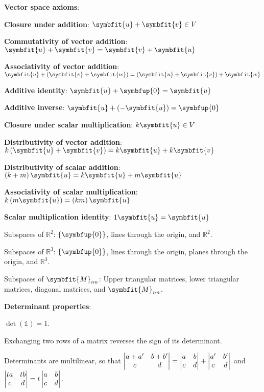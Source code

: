 \documentclass{article}
\begin{document}
\noindent\textbf{Vector space axioms}:

\noindent\textbf{Closure under addition}: $\symbfit{u}+\symbfit{v} \in V$ 

\noindent\textbf{Commutativity of vector addition}: $\symbfit{u} + \symbfit{v} = \symbfit{v} + \symbfit{u}$

\noindent\textbf{Associativity of vector addition}: $\symbfit{u} + \left(\symbfit{v} + \symbfit{w}\right) = \left(\symbfit{u} + \symbfit{v}\right) + \symbfit{w}$

\noindent\textbf{Additive identity}: $\symbfit{u} + \symbfup{0} = \symbfit{u}$

\noindent\textbf{Additive inverse}: $\symbfit{u} + \left(-\symbfit{u}\right) = \symbfup{0}$

\noindent\textbf{Closure under scalar multiplication}: $k\symbfit{u} \in V$

\noindent\textbf{Distributivity of vector addition}: $k \left(\symbfit{u} + \symbfit{v}\right) = k\symbfit{u} + k\symbfit{v}$

\noindent\textbf{Distributivity of scalar addition}: $\left(k+m\right)\symbfit{u} = k\symbfit{u} + m\symbfit{u}$

\noindent\textbf{Associativity of scalar multiplication}: $k\left(m\symbfit{u}\right)=\left(km\right)\symbfit{u}$

\noindent\textbf{Scalar multiplication identity}: $1 \symbfit{u}=\symbfit{u}$

\noindent Subspaces of $\mathbb{R}^2$: $\left\{ \symbfup{0} \right\}$, lines through the origin, and $\mathbb{R}^2$.

\noindent Subspaces of $\mathbb{R}^3$: $\left\{ \symbfup{0} \right\}$, lines through the origin, planes through the origin, and $\mathbb{R}^3$.

\noindent Subspaces of $\symbfit{M}_{nn}$: Upper triangular matrices, lower triangular matrices, diagonal matrices, and $\symbfit{M}_{nn}$.

\noindent\textbf{Determinant properties}:

\noindent$\det{\left( \mathbb{1} \right)}=1$. 

\noindent Exchanging two rows of a matrix reverses the sign of its determinant. 

\noindent Determinants are multilinear, so that $\mdet{a+a' & b+b' \\ c & d} = \mdet{a & b \\ c & d}+\mdet{a' & b' \\ c & d}$ and $\mdet{ta & tb \\ c & d}=t\mdet{a & b \\ c & d}$. 
\end{document}
